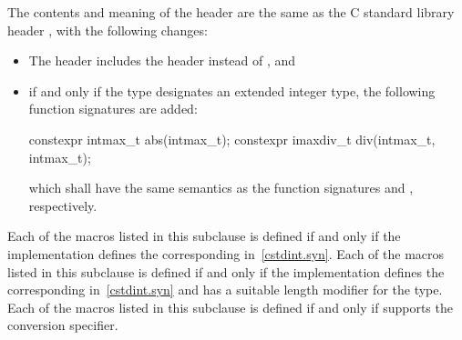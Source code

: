 \pnum
The contents and meaning of the header 
are the same as the C standard library header ,
with the following changes:
\begin{itemize}
\item
The header  includes the header  instead
of , and
\item
if and only if the type  designates an extended integer
type, the following function signatures are added:
\begin{codeblock}
constexpr intmax_t abs(intmax_t);
constexpr imaxdiv_t div(intmax_t, intmax_t);
\end{codeblock}
which shall have the same semantics as the function signatures
 and
, respectively.
\end{itemize}


\pnum
Each of the  macros listed in this subclause
is defined if and only if the implementation
defines the corresponding  in~\ref{cstdint.syn}.
Each of the  macros listed in this subclause
is defined if and only if the implementation
defines the corresponding  in~\ref{cstdint.syn} and
has a suitable  length modifier for the type.
Each of the  macros listed in this subclause
is defined if and only if  supports
the  conversion specifier.
